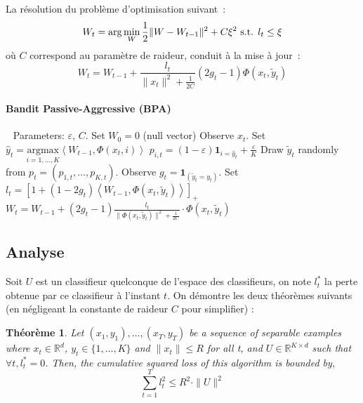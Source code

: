 \documentclass[twocolumn]{article}
\newtheorem{theorem}{Théorème}
\begin{document}
La résolution du problème d'optimisation suivant~:
$$W_{t} = \arg \min_W \frac{1}{2} \| W - W_{t-1}\|^2 + C \xi^2 \hbox{ s.t. } l_t \leq \xi$$
où $C$ correspond au paramètre de raideur, conduit à la mise à jour~:
$$W_{t} =  W_{t-1} + \frac{l_t}{\|x_t\|^2 + \frac{1}{2C}} (2g_t - 1) \Phi(x_t,\tilde{y}_t)$$

\paragraph{Bandit Passive-Aggressive (BPA)}
	\begin{algorithmic}
		\STATE $\ \ $
		\STATE Parameters:  $\varepsilon$, $C$.
		\STATE Set $W_0 = 0$ (null vector)
		\STATE Observe $x_t$.
		\STATE Set $\hat{y}_t = \underset{i = 1,\dots,K}{\text{argmax}}\left\langle W_{t-1} ,\Phi(x_t,i)\right\rangle$
		\STATE $p_{i,t}= (1-\varepsilon)\mathbf{1}_{i = \hat{y}_t} + \frac{\varepsilon}{K}$
		\ENDFOR
		\STATE Draw $\tilde{y}_t$ randomly from $p_t = \left(p_{1,t},\dots ,p_{K,t}\right)$.
		\STATE Observe $g_t = \mathbf{1}_{(\tilde{y}_t=y_t)}$.
		\STATE Set $l_t = [ 1+(1-2g_t)\left\langle W_{t-1},\Phi(x_t,\tilde{y}_t)\right\rangle]_{+}$ 
		\STATE $W_t = W_{t-1} + (2g_t-1)\frac{l_t}{\parallel\Phi(x_t,\tilde{y}_t)\parallel^2 + \frac{1}{2C}}\cdot\Phi(x_t,\tilde{y}_t)$
		\ENDFOR
	\end{algorithmic}


\subsection{Analyse}
Soit $U$ est un classifieur quelconque de l'espace des classifieurs, on note $l_t^{\ast}$ la perte obtenue par ce classifieur à l'instant $t$. On démontre les deux théorèmes suivants (en négligeant la constante de raideur $C$ pour simplifier) :

\begin{theorem}
	\label{theo:BPAT1}
	Let $(x_1,y_1),...,(x_T,y_T)$ be a sequence of separable examples where $x_t \in \mathbb{R}^d$, $y_t\in \{1,...,K\}$ and $\parallel x_t \parallel\leqslant R$ for all t, and $U \in \mathbb{R}^{K\times d}$ such that $ \forall t, l^*_t=0$. Then, the cumulative squared loss of this algorithm is bounded by,
	\begin{equation}
	\sum_{t=1}^{T} l_t^2 \leqslant R^2\cdot \parallel{U}\parallel^2
	\end{equation}
\end{theorem}
\end{document}
